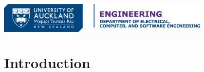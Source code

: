 \documentclass[
  14pt,
  a4paper,
  oneside,
  open=any,
  a4paper,
  14pt]{report}
\renewcommand*\contentsname{Table of contents}
\newcommand\contentsname{Table of contents}
\begin{document}
\begin{titlepage}
\newcommand{\affiliationblock}{{\titlepageaffiliationblock}

\vspace{0pt}
}

\newcommand{\logoblock}{{\includegraphics[width=0.8\textwidth]{images/DECSE-HC-4C-01.png}}

\vspace{2\baselineskip}
}

\newcommand{\footerblock}{}

\newcommand{\dateblock}{{\titlepagedateblock}

\vspace{0pt}
}

\newcommand{\headerblock}{}

\thispagestyle{empty} %


\newlength{\minipagewidth}
\setlength{\minipagewidth}{\textwidth}
\raggedright %
\begin{minipage}[b][\textheight][s]{\minipagewidth}
\titlepagepagealign
\headerblock

\logoblock

\titleblock

\authorblock

\vfill

\dateblock
\par

\end{minipage}
\clearpage
\end{titlepage}
\setcounter{page}{1}


\renewcommand*\contentsname{Table of contents}
{
\hypersetup{linkcolor=}
\setcounter{tocdepth}{3}
\tableofcontents
}
\listoffigures


\chapter*{Introduction}\label{introduction}
\end{document}
